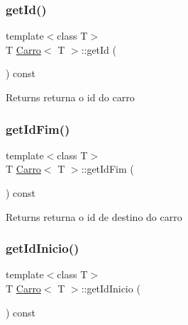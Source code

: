 \subsubsection{\texorpdfstring{get\+Id()}{getId()}}
{\footnotesize\ttfamily template$<$class T$>$ \\
T \mbox{\hyperlink{class_carro}{Carro}}$<$ T $>$\+::get\+Id (\begin{DoxyParamCaption}{ }\end{DoxyParamCaption}) const\hspace{0.3cm}{\ttfamily [inline]}}

\begin{DoxyReturn}{Returns}
returna o id do carro 
\end{DoxyReturn}
\mbox{\label{class_carro_aa6284214e8970464875ca6186937addd}} 
\subsubsection{\texorpdfstring{get\+Id\+Fim()}{getIdFim()}}
{\footnotesize\ttfamily template$<$class T$>$ \\
T \mbox{\hyperlink{class_carro}{Carro}}$<$ T $>$\+::get\+Id\+Fim (\begin{DoxyParamCaption}{ }\end{DoxyParamCaption}) const\hspace{0.3cm}{\ttfamily [inline]}}

\begin{DoxyReturn}{Returns}
returna o id de destino do carro 
\end{DoxyReturn}
\mbox{\label{class_carro_afc97b5bbf41b203cb80c10ea4628fc0a}} 
\subsubsection{\texorpdfstring{get\+Id\+Inicio()}{getIdInicio()}}
{\footnotesize\ttfamily template$<$class T$>$ \\
T \mbox{\hyperlink{class_carro}{Carro}}$<$ T $>$\+::get\+Id\+Inicio (\begin{DoxyParamCaption}{ }\end{DoxyParamCaption}) const\hspace{0.3cm}{\ttfamily [inline]}}

